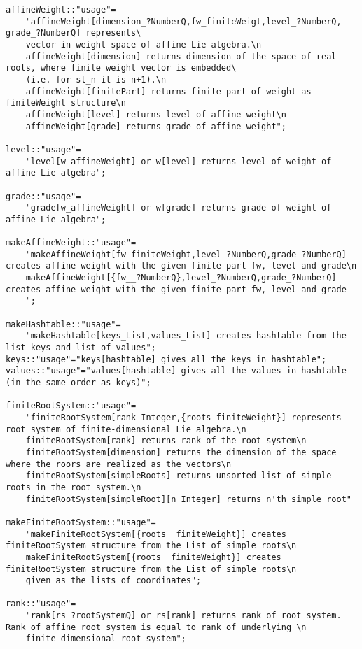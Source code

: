 \documentclass[preprint,12pt]{article}
\begin{document}
\begin{lstlisting}
affineWeight::"usage"=
    "affineWeight[dimension_?NumberQ,fw_finiteWeigt,level_?NumberQ, grade_?NumberQ] represents\ 
    vector in weight space of affine Lie algebra.\n 
    affineWeight[dimension] returns dimension of the space of real roots, where finite weight vector is embedded\ 
    (i.e. for sl_n it is n+1).\n 
    affineWeight[finitePart] returns finite part of weight as finiteWeight structure\n
    affineWeight[level] returns level of affine weight\n
    affineWeight[grade] returns grade of affine weight";

level::"usage"=
    "level[w_affineWeight] or w[level] returns level of weight of affine Lie algebra";

grade::"usage"=
    "grade[w_affineWeight] or w[grade] returns grade of weight of affine Lie algebra";

makeAffineWeight::"usage"= 
    "makeAffineWeight[fw_finiteWeight,level_?NumberQ,grade_?NumberQ] creates affine weight with the given finite part fw, level and grade\n
    makeAffineWeight[{fw__?NumberQ},level_?NumberQ,grade_?NumberQ] creates affine weight with the given finite part fw, level and grade
    ";

makeHashtable::"usage"=
    "makeHashtable[keys_List,values_List] creates hashtable from the list keys and list of values";
keys::"usage"="keys[hashtable] gives all the keys in hashtable";
values::"usage"="values[hashtable] gives all the values in hashtable (in the same order as keys)";

finiteRootSystem::"usage"=
    "finiteRootSystem[rank_Integer,{roots_finiteWeight}] represents root system of finite-dimensional Lie algebra.\n
    finiteRootSystem[rank] returns rank of the root system\n
    finiteRootSystem[dimension] returns the dimension of the space where the roors are realized as the vectors\n
    finiteRootSystem[simpleRoots] returns unsorted list of simple roots in the root system.\n
    finiteRootSystem[simpleRoot][n_Integer] returns n'th simple root"

makeFiniteRootSystem::"usage"=
    "makeFiniteRootSystem[{roots__finiteWeight}] creates finiteRootSystem structure from the List of simple roots\n
    makeFiniteRootSystem[{roots__finiteWeight}] creates  finiteRootSystem structure from the List of simple roots\n
    given as the lists of coordinates";

rank::"usage"=
    "rank[rs_?rootSystemQ] or rs[rank] returns rank of root system. Rank of affine root system is equal to rank of underlying \n
    finite-dimensional root system";


\end{lstlisting}
\end{document}
